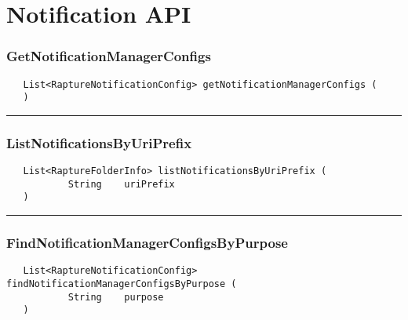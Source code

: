\chapter{Notification API}

\subsection{GetNotificationManagerConfigs}
\label{Api:GetNotificationManagerConfigs}
\begin{verbatim}
   List<RaptureNotificationConfig> getNotificationManagerConfigs (
   )
\end{verbatim}



\rule{15cm}{2pt}
\subsection{ListNotificationsByUriPrefix}
\label{Api:ListNotificationsByUriPrefix}
\begin{verbatim}
   List<RaptureFolderInfo> listNotificationsByUriPrefix (
           String    uriPrefix
   )
\end{verbatim}



\rule{15cm}{2pt}
\subsection{FindNotificationManagerConfigsByPurpose}
\label{Api:FindNotificationManagerConfigsByPurpose}
\begin{verbatim}
   List<RaptureNotificationConfig> findNotificationManagerConfigsByPurpose (
           String    purpose
   )
\end{verbatim}



